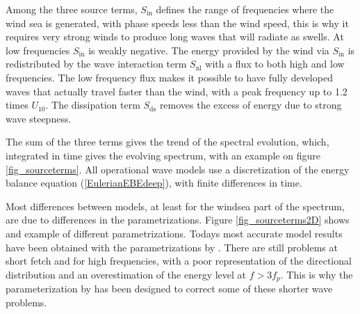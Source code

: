 Among the three source terms, $S_{\mathrm{in}}$ defines the range of frequencies where the 
wind sea is generated, with phase speeds less than the wind speed, this is why 
it requires very strong winds to produce long waves that will radiate as swells. At low frequencies $S_{\mathrm{in}}$ is weakly negative.
The energy provided by the wind via $S_{\mathrm{in}}$ is redistributed 
by the wave interaction term $S_{\mathrm{nl}}$ with a flux to both high and low frequencies. The low 
frequency flux makes it possible to have fully developed waves that actually travel faster than the wind, 
with  a peak frequency up to 1.2 times $U_{10}$. The dissipation term $S_{\mathrm{ds}}$ removes the excess of energy 
due to strong wave steepness. 

The sum of the three terms gives the trend of the spectral evolution, which, integrated in 
time gives the evolving spectrum, with an example on figure \ref{fig_sourceterms}. All operational wave models use a 
discretization of the energy balance equation (\ref{EulerianEBEdeep}), with finite differences in time. 

Most differences between models, at least for the windsea part of the spectrum, are due to differences in the parametrizations. 
Figure \ref{fig_sourceterms2D} shows and example of different parametrizations.
Todays most accurate model results have been obtained with the parametrizations by \cite{Rascle&Ardhuin2013}. There are still problems 
at short fetch and for high frequencies, with a poor representation of the directional distribution and an overestimation of the energy 
level at $f > 3 f_p$. This is why the parameterization by \cite{Romero2019} has been designed to correct some of these shorter wave problems.

